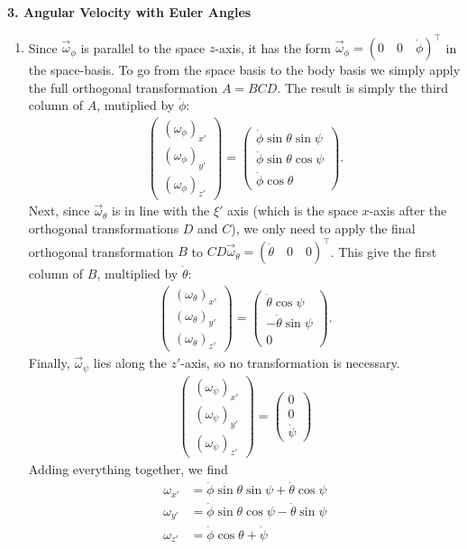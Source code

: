 \documentclass{article}
\theoremstyle{definition}
\begin{document}
\noindent \textbf{3. Angular Velocity with Euler Angles}



\begin{enumerate}[label=(\alph*)]
	\item Since $\vec{\omega}_\phi$ is parallel to the space $z$-axis, it has the form $\vec{\omega}_\phi = (0\quad 0 \quad \dot\phi)^\top$ in the space-basis. To go from the space basis to the body basis we simply apply the full orthogonal transformation $A = BCD$. The result is simply the third column of $A$, mutiplied by $\dot\phi$:
	\begin{align*}
	\begin{pmatrix}
	(\omega_\phi)_{x'} \\
	(\omega_\phi)_{y'} \\
	(\omega_\phi)_{z'} 
	\end{pmatrix}
	= \begin{pmatrix}
	\dot\phi \sin\theta \sin\psi \\ \dot\phi \sin\theta \cos\psi  \\ \dot\phi \cos\theta
	\end{pmatrix}.
	\end{align*}
	Next, since $\vec{\omega}_\theta$ is in line with the $\xi'$ axis (which is the space $x$-axis after the orthogonal transformations $D$ and $C$), we only need to apply the final orthogonal transformation $B$ to $CD\vec{\omega}_\theta = (\dot\theta \quad 0 \quad 0)^\top$. This give the first column of $B$, multiplied by $\dot\theta$:
	\begin{align*}
	\begin{pmatrix}
	(\omega_\theta)_{x'} \\
	(\omega_\theta)_{y'} \\
	(\omega_\theta)_{z'} 
	\end{pmatrix}
	= \begin{pmatrix}
	\dot\theta\cos\psi \\ -\dot\theta\sin\psi \\ 0
	\end{pmatrix}.
	\end{align*}
	Finally, $\vec{\omega}_\psi$ lies along the $z'$-axis, so no transformation is necessary. 
	\begin{align*}
	\begin{pmatrix}
	(\omega_\psi)_{x'} \\
	(\omega_\psi)_{y'} \\
	(\omega_\psi)_{z'} 
	\end{pmatrix} = \begin{pmatrix}
	0 \\ 0 \\ \dot\psi
	\end{pmatrix}
	\end{align*}
	Adding everything together, we find 
	\begin{align*}
	\omega_{x'} &= \dot\phi \sin\theta\sin\psi + \dot\theta \cos\psi  \\
	\omega_{y'} &= \dot\phi \sin\theta \cos\psi - \dot\theta \sin\psi \\
	\omega_{z'} &= \dot\phi \cos\theta + \dot\psi
	\end{align*}
	

\end{enumerate}
\end{document}
